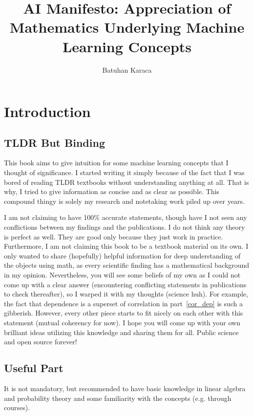 \documentclass{article}
\title{AI Manifesto: Appreciation of Mathematics Underlying Machine Learning Concepts}
\author{Batuhan Karaca}
\numberwithin{equation}{subsection}
\begin{document}
\maketitle
\tableofcontents
\section{Introduction}
\subsection{TLDR But Binding}
This book aims to give intuition for some machine learning concepts that I thought of significance. I started writing it simply because of the fact that I was bored of reading TLDR textbooks without understanding anything at all. That is why, I tried to give information as concise and as clear as possible. This compound thingy is solely my research and notetaking work piled up over years. 

I am not claiming to have 100\% accurate statements, though have I not seen any conflictions between my findings and the publications. I do not think any theory is perfect as well. They are good only because they just work in practice. Furthermore, I am not claiming this book to be a textbook material on its own. I only wanted to share (hopefully) helpful information for deep understanding of the objects using math, as every scientific finding has a mathematical background in my opinion. Nevertheless, you will see some beliefs of my own as I could not come up with a clear answer (encountering conflicting statements in publications to check thereafter), so I warped it with my thoughts (science huh). For example, the fact that dependence is a superset of correlation in part~\ref{cor_dep} is such a gibberish. However, every other piece starts to fit nicely on each other with this statement (mutual coherency for now). I hope you will come up with your own brilliant ideas utilizing this knowledge and sharing them for all. Public science and open source forever!
\subsection{Useful Part}
It is not mandatory, but recommended to have basic knowledge in linear algebra and probability theory and some familiarity with the concepts (e.g. through courses). 
\end{document}
